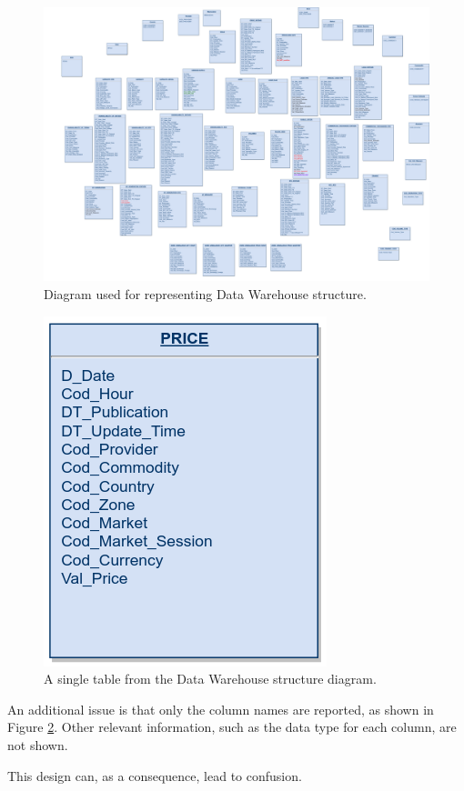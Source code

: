     \begin{figure}[p]
        \centering
        \includegraphics[width=\textwidth]{res/dwh_diagram.png}
        \caption{Diagram used for representing Data Warehouse structure.}
        \label{fig:reply:issues:dwh_diagram}
    \end{figure}
    
    \begin{figure}[p]
        \centering
        \includegraphics[width=.35\textwidth]{res/dwh_diagram_price.png}
        \caption{A single table from the Data Warehouse structure diagram.}
        \label{fig:reply:issues:dwh_diagram_table}
    \end{figure}
    
    An additional issue is that only the column names are reported, as shown in Figure \ref{fig:reply:issues:dwh_diagram_table}.
    Other relevant information, such as the data type for each column, are not shown.
    
    This design can, as a consequence, lead to confusion.